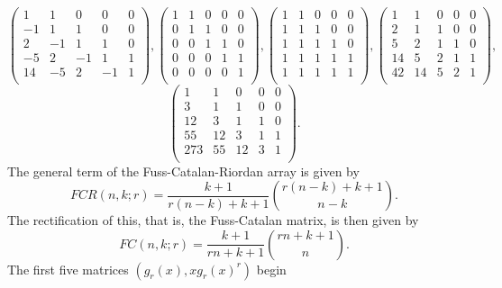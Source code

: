 \documentclass[12pt,reqno]{article}
\theoremstyle{definition}
\begin{document}
$$\left(
\begin{array}{ccccc}
1&  1 & 0 & 0 & 0 \\
-1 & 1 & 1 & 0 & 0 \\
2 & -1 & 1 & 1 & 0 \\
-5 & 2 & -1 & 1 & 1  \\
14 & -5 & 2 & -1 & 1 \\
\end{array}\right),
\left(
\begin{array}{ccccc}
1&  1 & 0 & 0 & 0 \\
0 & 1 & 1 & 0 & 0 \\
0 & 0 & 1 & 1 & 0 \\
0 & 0 & 0 & 1 & 1  \\
0 & 0 & 0 & 0 & 1 \\
\end{array}\right),\left(
\begin{array}{ccccc}
1& 1 & 0 & 0 & 0 \\
1 & 1 & 1 & 0 & 0 \\
1 & 1 & 1 & 1 & 0 \\
1 & 1 & 1 & 1 & 1  \\
1 & 1 & 1 & 1 & 1 \\
\end{array}\right),\left(
\begin{array}{ccccc}
1& 1 & 0 & 0 & 0 \\
2 & 1 & 1 & 0 & 0 \\
5 & 2 & 1 & 1 & 0 \\
14 & 5 & 2 & 1 & 1  \\
42 &14 & 5 & 2 & 1 \\
\end{array}\right),$$
$$\left(
\begin{array}{ccccc}
1& 1 & 0 & 0 & 0 \\
3 & 1 & 1 & 0 & 0 \\
12 & 3 & 1 & 1 & 0 \\
55 & 12 & 3 & 1 & 1  \\
273 &55 & 12 & 3 & 1 \\
\end{array}\right).$$
The general term of the Fuss-Catalan-Riordan array is given by
$$FCR(n,k;r)=\frac{k+1}{r(n-k)+k+1}\binom{r(n-k)+k+1}{n-k}.$$
The rectification of this, that is, the Fuss-Catalan matrix, is then given by
$$FC(n,k;r)=\frac{k+1}{rn+k+1}\binom{rn+k+1}{n}.$$
The first five matrices $(g_r(x), xg_r(x)^r)$ begin
\end{document}
